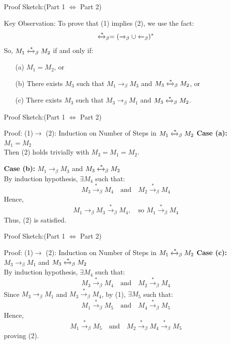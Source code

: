 \documentclass{beamer}
\begin{document}
\begin{frame}{Proof Sketch:(Part 1 $\Leftrightarrow$ Part 2)}
  \begin{block}{Key Observation:}   
      To prove that (1) implies (2), we use the fact:
      \[
        \xleftrightarrow{*}_\beta = (\xrightarrow{\ }_\beta \cup \xleftarrow{\ }_\beta)^*
      \]
      So, $M_1 \xleftrightarrow{*}_\beta M_2$ if and only if:
      \begin{itemize}
        \item[(a)] $M_1 = M_2$, or
        \item[(b)] There exists $M_3$ such that $M_1 \xrightarrow{\ }_\beta M_3$ and $M_3 \xleftrightarrow{*}_\beta M_2$, or
        \item[(c)] There exists $M_3$ such that $M_3 \xrightarrow{\ }_\beta M_1$ and $M_3 \xleftrightarrow{*}_\beta M_2$.
      \end{itemize}
  \end{block}
\end{frame}
\begin{frame}{Proof Sketch:(Part 1 $\Leftrightarrow$ Part 2)}
  \begin{block}{Proof: (1)$\rightarrow$ (2): Induction on Number of Steps in $M_1 \xleftrightarrow{*}_\beta M_2$}
    \textbf{Case (a):} $M_1 = M_2$ \\
    Then (2) holds trivially with $M_3 = M_1 = M_2$.

    \vspace{1em}
    \textbf{Case (b):} $M_1 \xrightarrow{\ }_\beta M_3$ and $M_3 \xleftrightarrow{*}_\beta M_2$ \\
    By induction hypothesis, $\exists M_4$ such that:
    \[
    M_3 \xrightarrow{*}_\beta M_4 \quad \text{and} \quad M_2 \xrightarrow{*}_\beta M_4
    \]
    Hence, 
    \[
    M_1 \xrightarrow{\ }_\beta M_3 \xrightarrow{*}_\beta M_4, \quad \text{so } M_1 \xrightarrow{*}_\beta M_4
    \]
    Thus, (2) is satisfied.

  \end{block}
\end{frame}
  \begin{frame}{Proof Sketch:(Part 1 $\Leftrightarrow$ Part 2)}
    \begin{block}{Proof: (1)$\rightarrow$ (2): Induction on Number of Steps in $M_1 \xleftrightarrow{*}_\beta M_2$}
    \textbf{Case (c):} $M_3 \xrightarrow{\ }_\beta M_1$ and $M_3 \xleftrightarrow{*}_\beta M_2$ \\
    By induction hypothesis, $\exists M_4$ such that:
    \[
    M_3 \xrightarrow{*}_\beta M_4 \quad \text{and} \quad M_2 \xrightarrow{*}_\beta M_4
    \]
    Since $M_3 \xrightarrow{\ }_\beta M_1$ and $M_3 \xrightarrow{*}_\beta M_4$, by (1), $\exists M_5$ such that:
    \[
    M_1 \xrightarrow{*}_\beta M_5 \quad \text{and} \quad M_4 \xrightarrow{*}_\beta M_5
    \]
    Hence, 
    \[
    M_1 \xrightarrow{*}_\beta M_5 \quad \text{and} \quad M_2 \xrightarrow{*}_\beta M_4 \xrightarrow{*}_\beta M_5
    \]
    proving (2).
  \end{block}
\end{frame}
\end{document}
